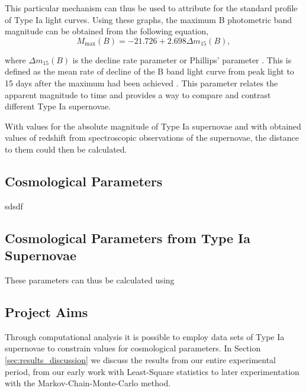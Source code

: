 \documentclass[twocolumn]{revtex4}
\begin{document}
This particular mechanism can thus be used to attribute for the standard profile of Type Ia light curves. Using these graphs, the maximum B photometric band magnitude can be obtained from the following equation,
\begin{equation}
M_{\max}(B)=-21.726+2.698\Delta m_{15}(B),
\end{equation}

where $\Delta m_{15}(B)$ is the decline rate parameter or Phillips' parameter \cite{high_en_astro}. This is defined as the mean rate of decline of the B band light curve from peak light to 15 days after the maximum had been achieved \cite{abs_phil}. This parameter relates the apparent magnitude to time and provides a way to compare and contrast different Type Ia supernovae.

With values for the absolute magnitude of Type Ia supernovae and with obtained values of redshift from spectroscopic observations of the supernovae, the distance to them could then be calculated.

\vspace{-3ex}
\subsection{Cosmological Parameters}
\vspace{-2ex}

sdsdf

\vspace{-3ex}
\subsection{Cosmological Parameters from Type Ia Supernovae}
\vspace{-2ex}
These parameters can thus be calculated using 

\vspace{-3ex}
\subsection{Project Aims}
\vspace{-2ex}

Through computational analysis it is possible to employ data sets of Type Ia supernovae to constrain values for cosmological parameters. In Section \ref{sec:results_discussion} we discuss the results from our entire experimental period, from our early work with Least-Square statistics to later experimentation with the Markov-Chain-Monte-Carlo method. 
\end{document}
